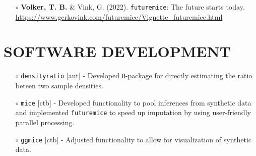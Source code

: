 \documentclass[11pt,a4paper,roman,colorlinks,linkcolor = blue]{moderncv}        %
\begin{document}
\begin{itemize}
\item[$\circ$] \textbf{Volker, T. B.} \& Vink, G. (2022). \texttt{futuremice}: The future starts today. \url{https://www.gerkovink.com/futuremice/Vignette_futuremice.html}
\end{itemize}

\section{SOFTWARE DEVELOPMENT}

\begin{itemize}

\item[$\circ$] \texttt{densityratio} [aut] - Developed \texttt{R}-package for directly estimating the ratio beteen two sample densities.
\item[$\circ$] \texttt{mice} [ctb] - Developed functionality to pool inferences from synthetic data and implemented \texttt{futuremice} to speed up imputation by using user-friendly parallel processing.
\item[$\circ$] \texttt{ggmice} [ctb] - Adjusted functionality to allow for visualization of synthetic data.
  \end{itemize}


\end{document}
